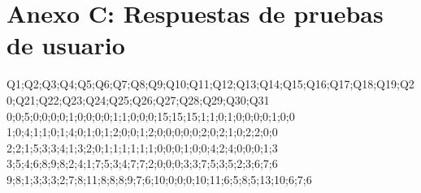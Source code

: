 \chapter{Anexo C: Respuestas de pruebas de usuario}\label{AnexoC}


Q1;Q2;Q3;Q4;Q5;Q6;Q7;Q8;Q9;Q10;Q11;Q12;Q13;Q14;Q15;Q16;Q17;Q18;Q19;Q20;Q21;Q22;Q23;Q24;Q25;Q26;Q27;Q28;Q29;Q30;Q31
0;0;5;0;0;0;0;1;0;0;0;0;1;1;0;0;0;15;15;15;1;1;0;1;0;0;0;0;1;0;0
1;0;4;1;1;0;1;4;0;1;0;1;2;0;0;1;2;0;0;0;0;0;2;0;2;1;0;2;2;0;0
2;2;1;5;3;3;4;1;3;2;0;1;1;1;1;1;1;0;0;0;1;0;0;4;2;4;0;0;0;1;3
3;5;4;6;8;9;8;2;4;1;7;5;3;4;7;7;2;0;0;0;3;3;7;5;3;5;2;3;6;7;6
9;8;1;3;3;3;2;7;8;11;8;8;8;9;7;6;10;0;0;0;10;11;6;5;8;5;13;10;6;7;6
